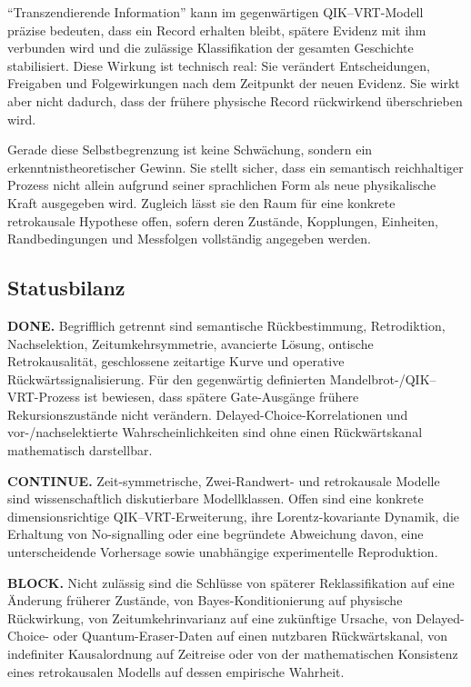\documentclass[11pt,a4paper]{article}
\theoremstyle{remark}
\newcommand{\statusbox}[2]{%
  \par\medskip\noindent
  \colorbox{#1}{\parbox{\dimexpr\linewidth-2\fboxsep\relax}{#2}}%
  \par\medskip
}
\begin{document}
``Transzendierende Information'' kann im gegenwärtigen QIK--VRT-Modell
präzise bedeuten, dass ein Record erhalten bleibt, spätere Evidenz mit ihm
verbunden wird und die zulässige Klassifikation der gesamten Geschichte
stabilisiert. Diese Wirkung ist technisch real: Sie verändert Entscheidungen,
Freigaben und Folgewirkungen nach dem Zeitpunkt der neuen Evidenz. Sie wirkt
aber nicht dadurch, dass der frühere physische Record rückwirkend
überschrieben wird.

Gerade diese Selbstbegrenzung ist keine Schwächung, sondern ein
erkenntnistheoretischer Gewinn. Sie stellt sicher, dass ein semantisch
reichhaltiger Prozess nicht allein aufgrund seiner sprachlichen Form als neue
physikalische Kraft ausgegeben wird. Zugleich lässt sie den Raum für eine
konkrete retrokausale Hypothese offen, sofern deren Zustände, Kopplungen,
Einheiten, Randbedingungen und Messfolgen vollständig angegeben werden.

\subsection{Statusbilanz}

\statusbox{QGreen}{
\textbf{DONE.}
Begrifflich getrennt sind semantische Rückbestimmung, Retrodiktion,
Nachselektion, Zeitumkehrsymmetrie, avancierte Lösung, ontische
Retrokausalität, geschlossene zeitartige Kurve und operative
Rückwärtssignalisierung. Für den gegenwärtig definierten
Mandelbrot-/QIK--VRT-Prozess ist bewiesen, dass spätere Gate-Ausgänge frühere
Rekursionszustände nicht verändern. Delayed-Choice-Korrelationen und
vor-/nachselektierte Wahrscheinlichkeiten sind ohne einen Rückwärtskanal
mathematisch darstellbar.
}

\statusbox{QAmber}{
\textbf{CONTINUE.}
Zeit-symmetrische, Zwei-Randwert- und retrokausale Modelle sind
wissenschaftlich diskutierbare Modellklassen. Offen sind eine konkrete
dimensionsrichtige QIK--VRT-Erweiterung, ihre Lorentz-kovariante Dynamik, die
Erhaltung von No-signalling oder eine begründete Abweichung davon, eine
unterscheidende Vorhersage sowie unabhängige experimentelle Reproduktion.
}

\statusbox{QRed}{
\textbf{BLOCK.}
Nicht zulässig sind die Schlüsse von späterer Reklassifikation auf eine
Änderung früherer Zustände, von Bayes-Konditionierung auf physische
Rückwirkung, von Zeitumkehrinvarianz auf eine zukünftige Ursache, von
Delayed-Choice- oder Quantum-Eraser-Daten auf einen nutzbaren Rückwärtskanal,
von indefiniter Kausalordnung auf Zeitreise oder von der mathematischen
Konsistenz eines retrokausalen Modells auf dessen empirische Wahrheit.
}
\end{document}

